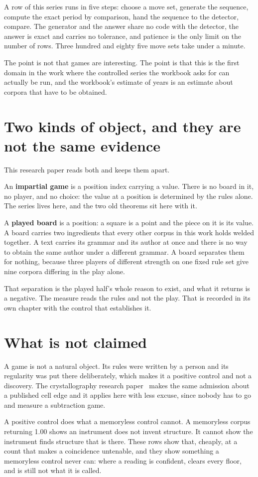 A row of this series runs in five steps: choose a move set, generate the sequence, compute the
exact period by comparison, hand the sequence to the detector, compare. The generator and the answer
share no code with the detector, the answer is exact and carries no tolerance, and patience is the
only limit on the number of rows. Three hundred and eighty five move sets take under a minute.

The point is not that games are interesting. The point is that this is the first domain in the work
where the controlled series the workbook asks for can actually be run, and the workbook's estimate
of years is an estimate about corpora that have to be obtained.

\section{Two kinds of object, and they are not the same evidence}

This research paper reads both and keeps them apart.

An \textbf{impartial game} is a position index carrying a value. There is no board in it, no player,
and no choice: the value at a position is determined by the rules alone. The series lives here, and
the two old theorems sit here with it.

A \textbf{played board} is a position: a square is a point and the piece on it is its value. A board
carries two ingredients that every other corpus in this work holds welded together. A text carries
its grammar and its author at once and there is no way to obtain the same author under a different
grammar. A board separates them for nothing, because three players of different strength on one
fixed rule set give nine corpora differing in the play alone.

That separation is the played half's whole reason to exist, and what it returns is a negative. The
measure reads the rules and not the play. That is recorded in its own chapter with the control that
establishes it.

\section{What is not claimed}

A game is not a natural object. Its rules were written by a person and its regularity was put there
deliberately, which makes it a positive control and not a discovery. The crystallography research paper~\cite{src:Quigg-crystallography} makes
the same admission about a published cell edge and it applies here with less excuse, since nobody
has to go and measure a subtraction game.

A positive control does what a memoryless control cannot. A memoryless corpus
returning 1.00 shows an instrument does not invent structure. It cannot show the instrument finds
structure that is there. These rows show that, cheaply, at a count that makes a coincidence
untenable, and they show something a memoryless control never can: where a reading is
confident, clears every floor, and is still not what it is called.
